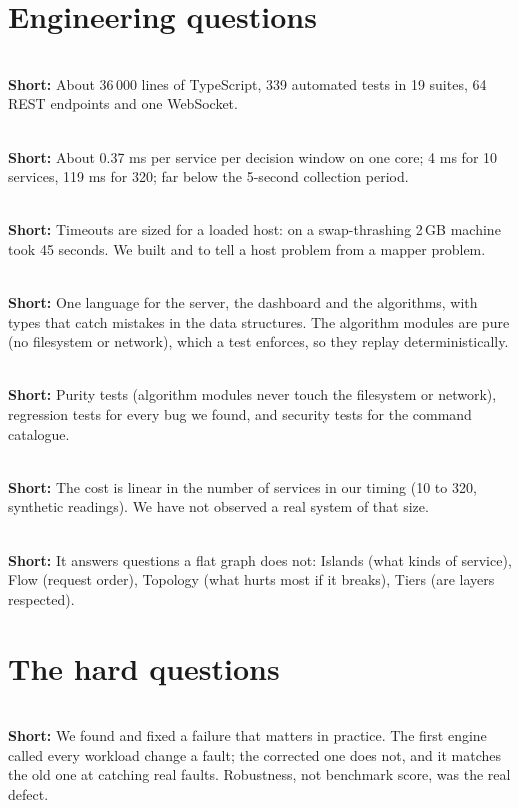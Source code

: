\section{Engineering questions}

\\
\textbf{Short:} About 36\,000 lines of TypeScript, 339 automated tests in 19 suites, 64 REST endpoints and one WebSocket.

\\
\textbf{Short:} About 0.37 ms per service per decision window on one core; 4 ms for 10 services, 119 ms for 320; far below the 5-second collection period.

\\
\textbf{Short:} Timeouts are sized for a loaded host: on a swap-thrashing 2\,GB machine  took 45 seconds. We built  and  to tell a host problem from a mapper problem.

\\
\textbf{Short:} One language for the server, the dashboard and the algorithms, with types that catch mistakes in the data structures. The algorithm modules are pure (no filesystem or network), which a test enforces, so they replay deterministically.

\\
\textbf{Short:} Purity tests (algorithm modules never touch the filesystem or network), regression tests for every bug we found, and security tests for the command catalogue.

\\
\textbf{Short:} The cost is linear in the number of services in our timing (10 to 320, synthetic readings). We have not observed a real system of that size.

\\
\textbf{Short:} It answers questions a flat graph does not: Islands (what kinds of service), Flow (request order), Topology (what hurts most if it breaks), Tiers (are layers respected).

\section{The hard questions}

\\
\textbf{Short:} We found and fixed a failure that matters in practice. The first engine called every workload change a fault; the corrected one does not, and it matches the old one at catching real faults. Robustness, not benchmark score, was the real defect.

